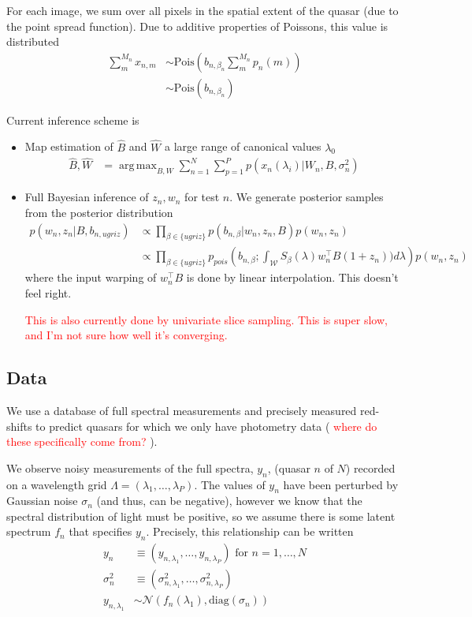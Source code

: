 \documentclass[11pt]{article}
\newcommand{\trans}{\intercal}
\DeclareMathOperator*{\argmax}{arg\,max}
\newcommand{\red}[1]{\textcolor{red}{#1}}
\begin{document}
For each image, we sum over all pixels in the spatial extent of the quasar (due to the point spread function).  Due to additive properties of Poissons, this value is distributed
\begin{align}
  \sum_{m}^{M_n} x_{n,m} &\sim \textrm{Pois}\left( b_{n, \beta_n} \sum_{m}^{M_n} p_n(m) \right) \\
    &\sim \textrm{Pois}\left( b_{n, \beta_n} \right) 
\end{align}

Current inference scheme is 
\begin{itemize}
\item Map estimation of $\hat B$ and $\hat W$ a large range of canonical values $\lambda_0$
\begin{align}
  \hat B, \hat W &= 
    \argmax_{B, W} \sum_{n=1}^N \sum_{p = 1}^P p(x_n(\lambda_i) | W_n, B, \sigma^2_n)
\end{align}

\item Full Bayesian inference of $z_n, w_n$ for test $n$.  
We generate posterior samples from the posterior distribution 
\begin{align}
  p(w_n, z_n | B, b_{n, ugriz})
    &\propto \prod_{\beta \in \{ugriz\}} p(b_{n, \beta} | w_n, z_n, B) p(w_n, z_n) \\
    &\propto \prod_{\beta \in \{ugriz\}} p_{pois}\left(b_{n, \beta}; \int_\mathcal{W} S_\beta(\lambda) w_n^\trans B (1 + z_n)) d\lambda \right) p(w_n, z_n)
\end{align}
where the input warping of $w_n^\trans B$ is done by linear interpolation.  This doesn't feel right.  

\red{ This is also currently done by univariate slice sampling.  This is super slow, and I'm not sure how well it's converging. }

\end{itemize}

\subsection{Data}
We use a database of full spectral measurements and precisely measured red-shifts to predict quasars for which we only have photometry data (\red{ where do these specifically come from? }).  

We observe noisy measurements of the full spectra, $y_n$, (quasar $n$ of $N$) recorded on a wavelength grid $\Lambda = (\lambda_1, \dots, \lambda_P)$.  The values of $y_n$ have been perturbed by Gaussian noise $\sigma_n$ (and thus, can be negative), however we know that the spectral distribution of light must be positive, so we assume there is some latent spectrum $f_n$ that specifies $y_n$.  Precisely, this relationship can be written
\begin{align}
  y_n &\equiv (y_{n, \lambda_1}, \dots, y_{n, \lambda_P}) \text{ for } n = 1, \dots, N \\
  \sigma_n^2 &\equiv (\sigma_{n, \lambda_1}^2, \dots, \sigma_{n, \lambda_P}^2) \\
  y_{n, \lambda_1} &\sim \mathcal{N}(f_n(\lambda_1), \textrm{diag}(\sigma_{n}))
\end{align}
\end{document}
